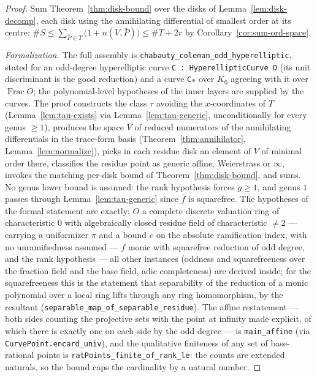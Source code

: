 \begin{proof}
\leanok
Sum Theorem~\ref{thm:disk-bound} over the disks of Lemma~\ref{lem:disk-decomp}, each disk
using the annihilating differential of smallest order at its centre:
$\#S \le \sum_{\bar P \in T} \bigl(1 + n(V, \bar P)\bigr)
\le \#T + 2r$ by Corollary~\ref{cor:sum-ord-space}.

\emph{Formalization.} The full assembly is
\texttt{chabauty\_coleman\_odd\_hyperelliptic}, stated for an odd-degree hyperelliptic curve
\texttt{C : HyperellipticCurve O} (its unit discriminant is the good reduction) and a curve
\texttt{C₀} over $K_0$ agreeing with it over $\operatorname{Frac} O$; the polynomial-level
hypotheses of the inner layers are supplied by the curves. The proof constructs the class $\tau$ avoiding the
$x$-coordinates of $T$ (Lemma~\ref{lem:tau-exists} via Lemma~\ref{lem:tau-generic},
unconditionally for every genus $\ge 1$), produces the space $V$ of reduced numerators of
the annihilating differentials in the trace-form basis (Theorem~\ref{thm:annihilator},
Lemma~\ref{lem:normalize}), picks in each residue disk an element of $V$ of minimal
order there, classifies the residue point as generic affine, Weierstrass or $\infty$,
invokes the matching per-disk bound of Theorem~\ref{thm:disk-bound}, and sums. No genus
lower bound is assumed: the rank hypothesis forces $g \ge 1$, and genus
$1$ passes through Lemma~\ref{lem:tau-generic} since $\bar f$ is squarefree. The
hypotheses of the formal statement are exactly: $O$ a complete discrete valuation ring
of characteristic $0$ with algebraically closed residue field of characteristic
$\neq 2$ --- carrying a uniformizer $\pi$ and a bound $e$ on the absolute ramification
index, with no unramifiedness assumed --- $f$ monic with squarefree reduction of odd
degree, and the rank hypothesis
--- all other instances (oddness and squarefreeness over the fraction field and the
base field, adic completeness) are derived inside; for the squarefreeness this is the
statement that separability of the reduction of a monic polynomial over a local ring
lifts through any ring homomorphism, by the resultant
(\texttt{separable\_map\_of\_separable\_residue}). The affine restatement --- both sides
counting the projective sets with the point at infinity made explicit, of which there is
exactly one on each side by the odd degree --- is \texttt{main\_affine} (via
\texttt{CurvePoint.encard\_univ}), and the qualitative finiteness of any set of
base-rational points is \texttt{ratPoints\_finite\_of\_rank\_le}: the counts are extended
naturals, so the bound caps the cardinality by a natural number.
\end{proof}

